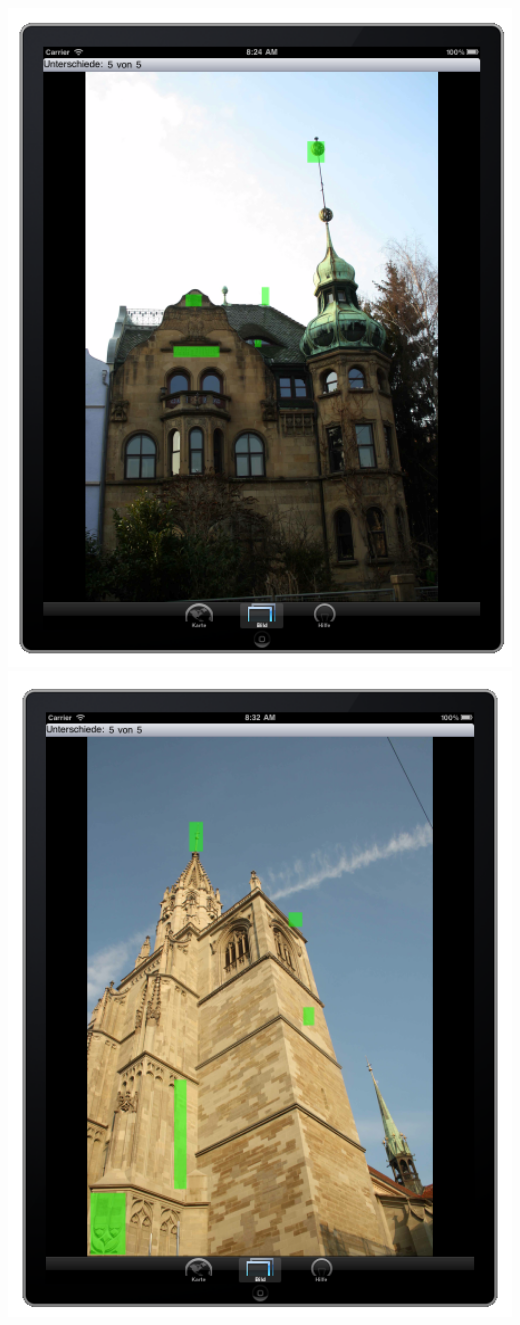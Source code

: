   \newpage  
  \includegraphics[width=1.0\textwidth]{bilder/loesung3.png}
  \newpage  
  \includegraphics[width=1.0\textwidth]{bilder/loesung4.png}
